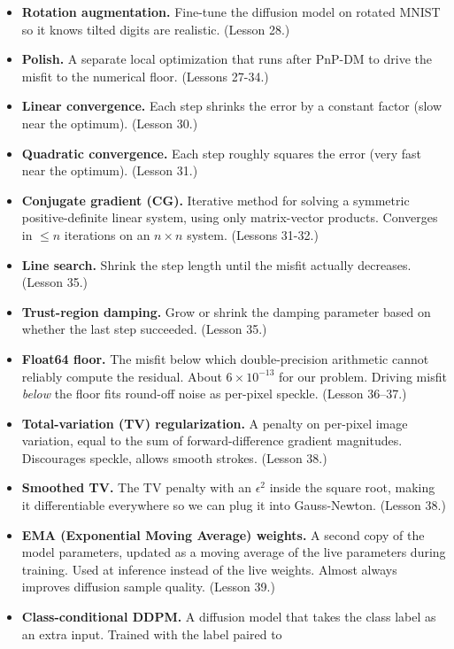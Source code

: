 \documentclass[11pt]{article}
\begin{document}
\begin{itemize}[leftmargin=2em]
  parallel so different modes of the posterior get explored. We use
  32. (Lesson 27.)
\item \textbf{Rotation augmentation.} Fine-tune the diffusion model
  on rotated MNIST so it knows tilted digits are realistic. (Lesson 28.)
\item \textbf{Polish.} A separate local optimization that runs after
  PnP-DM to drive the misfit to the numerical floor. (Lessons 27-34.)
\item \textbf{Linear convergence.} Each step shrinks the error by a
  constant factor (slow near the optimum). (Lesson 30.)
\item \textbf{Quadratic convergence.} Each step roughly squares the
  error (very fast near the optimum). (Lesson 31.)
\item \textbf{Conjugate gradient (CG).} Iterative method for solving
  a symmetric positive-definite linear system, using only
  matrix-vector products. Converges in $\le n$ iterations on an
  $n \times n$ system. (Lessons 31-32.)
\item \textbf{Line search.} Shrink the step length until the misfit
  actually decreases. (Lesson 35.)
\item \textbf{Trust-region damping.} Grow or shrink the damping
  parameter based on whether the last step succeeded. (Lesson 35.)
\item \textbf{Float64 floor.} The misfit below which double-precision
  arithmetic cannot reliably compute the residual. About $6 \times
  10^{-13}$ for our problem. Driving misfit \emph{below} the floor
  fits round-off noise as per-pixel speckle. (Lesson 36--37.)
\item \textbf{Total-variation (TV) regularization.} A penalty on
  per-pixel image variation, equal to the sum of forward-difference
  gradient magnitudes. Discourages speckle, allows smooth strokes.
  (Lesson 38.)
\item \textbf{Smoothed TV.} The TV penalty with an $\epsilon^2$ inside
  the square root, making it differentiable everywhere so we can
  plug it into Gauss-Newton. (Lesson 38.)
\item \textbf{EMA (Exponential Moving Average) weights.} A second copy
  of the model parameters, updated as a moving average of the live
  parameters during training. Used at inference instead of the live
  weights. Almost always improves diffusion sample quality. (Lesson 39.)
\item \textbf{Class-conditional DDPM.} A diffusion model that takes
  the class label as an extra input. Trained with the label paired to

\end{itemize}
\end{document}
